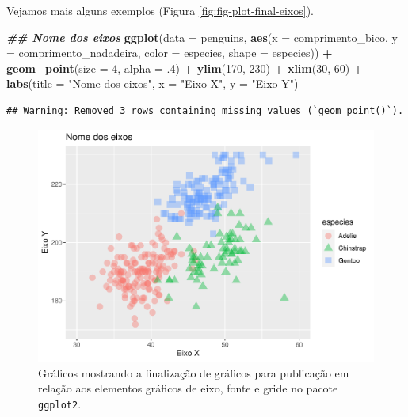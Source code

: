 \documentclass[
]{article}
\newenvironment{Shaded}{\begin{snugshade}}{\end{snugshade}}
\newcommand{\AttributeTok}[1]{\textcolor[rgb]{0.13,0.29,0.53}{#1}}
\newcommand{\DecValTok}[1]{\textcolor[rgb]{0.00,0.00,0.81}{#1}}
\newcommand{\DocumentationTok}[1]{\textcolor[rgb]{0.56,0.35,0.01}{\textbf{\textit{#1}}}}
\newcommand{\FunctionTok}[1]{\textcolor[rgb]{0.13,0.29,0.53}{\textbf{#1}}}
\newcommand{\NormalTok}[1]{#1}
\newcommand{\SpecialCharTok}[1]{\textcolor[rgb]{0.81,0.36,0.00}{\textbf{#1}}}
\newcommand{\StringTok}[1]{\textcolor[rgb]{0.31,0.60,0.02}{#1}}
\begin{document}
Vejamos mais alguns exemplos (Figura \ref{fig:fig-plot-final-eixos}).

\begin{Shaded}
\begin{Highlighting}[]
\DocumentationTok{\#\# Nome dos eixos}
\FunctionTok{ggplot}\NormalTok{(}\AttributeTok{data =}\NormalTok{ penguins,  }
       \FunctionTok{aes}\NormalTok{(}\AttributeTok{x =}\NormalTok{ comprimento\_bico, }\AttributeTok{y =}\NormalTok{ comprimento\_nadadeira, }
           \AttributeTok{color =}\NormalTok{ especies, }\AttributeTok{shape =}\NormalTok{ especies)) }\SpecialCharTok{+}
    \FunctionTok{geom\_point}\NormalTok{(}\AttributeTok{size =} \DecValTok{4}\NormalTok{, }\AttributeTok{alpha =}\NormalTok{ .}\DecValTok{4}\NormalTok{) }\SpecialCharTok{+}
    \FunctionTok{ylim}\NormalTok{(}\DecValTok{170}\NormalTok{, }\DecValTok{230}\NormalTok{) }\SpecialCharTok{+}
    \FunctionTok{xlim}\NormalTok{(}\DecValTok{30}\NormalTok{, }\DecValTok{60}\NormalTok{) }\SpecialCharTok{+}
    \FunctionTok{labs}\NormalTok{(}\AttributeTok{title =} \StringTok{"Nome dos eixos"}\NormalTok{, }\AttributeTok{x =} \StringTok{"Eixo X"}\NormalTok{, }\AttributeTok{y =} \StringTok{"Eixo Y"}\NormalTok{)}
\end{Highlighting}
\end{Shaded}

\begin{verbatim}
## Warning: Removed 3 rows containing missing values (`geom_point()`).
\end{verbatim}

\begin{figure}
\centering
\includegraphics{epr_files/figure-latex/fig-plot-final-eixos-1.pdf}
\caption{\label{fig:fig-plot-final-eixos-1}Gráficos mostrando a finalização de gráficos para publicação em relação aos elementos gráficos de eixo, fonte e gride no pacote \texttt{ggplot2}.}
\end{figure}
\end{document}

